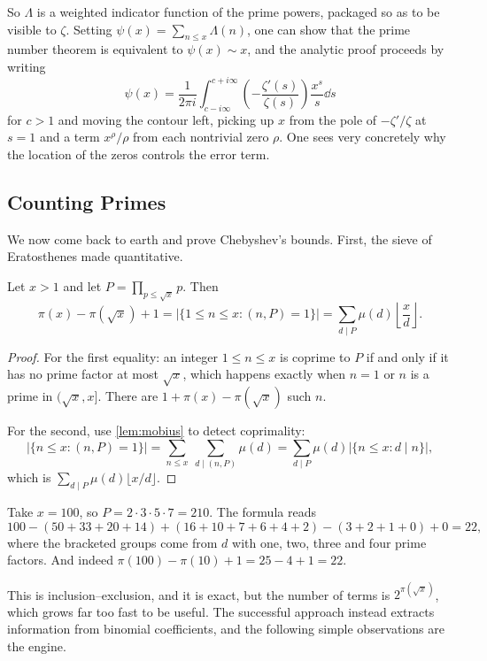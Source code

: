\documentclass[a4paper]{scrartcl}
\begin{document}
So $\Lambda$ is a weighted indicator function of the prime powers, packaged so as to be visible to $\zeta$. Setting $\psi(x) = \sum_{n \leq x}\Lambda(n)$, one can show that the prime number theorem is equivalent to $\psi(x) \sim x$, and the analytic proof proceeds by writing
$$
\psi(x) = \frac1{2\pi i}\int_{c - i\infty}^{c+i\infty}\left(-\frac{\zeta'(s)}{\zeta(s)}\right)\frac{x^s}s\dd s
$$
for $c > 1$ and moving the contour left, picking up $x$ from the pole of $-\zeta'/\zeta$ at $s = 1$ and a term $x^\rho/\rho$ from each nontrivial zero $\rho$. One sees very concretely why the location of the zeros controls the error term.

\subsection{Counting Primes}

We now come back to earth and prove Chebyshev's bounds. First, the sieve of Eratosthenes made quantitative.

\begin{proposition}
	Let $x > 1$ and let $P = \prod_{p \leq \sqrt x}p$. Then
	$$
	\pi(x) - \pi(\sqrt x) + 1 = \left|\{1 \leq n \leq x : (n, P) = 1\}\right| = \sum_{d \mid P}\mu(d)\left\lfloor\frac xd\right\rfloor.
	$$
\end{proposition}
\begin{proof}
	For the first equality: an integer $1 \leq n \leq x$ is coprime to $P$ if and only if it has no prime factor at most $\sqrt x$, which happens exactly when $n = 1$ or $n$ is a prime in $(\sqrt x, x]$. There are $1 + \pi(x) - \pi(\sqrt x)$ such $n$.

	For the second, use \autoref{lem:mobius} to detect coprimality:
	$$
	\left|\{n \leq x : (n,P) = 1\}\right| = \sum_{n \leq x}\ \sum_{d \mid (n, P)}\mu(d) = \sum_{d \mid P}\mu(d)\left|\{n \leq x : d \mid n\}\right|,
	$$
	which is $\sum_{d\mid P}\mu(d)\lfloor x/d\rfloor$.
\end{proof}

\begin{example}
	Take $x = 100$, so $P = 2\cdot3\cdot5\cdot7 = 210$. The formula reads
	$$
	100 - \left(50 + 33 + 20 + 14\right) + \left(16 + 10 + 7 + 6 + 4 + 2\right) - \left(3 + 2 + 1 + 0\right) + 0 = 22,
	$$
	where the bracketed groups come from $d$ with one, two, three and four prime factors. And indeed $\pi(100) - \pi(10) + 1 = 25 - 4 + 1 = 22$.
\end{example}

This is inclusion--exclusion, and it is exact, but the number of terms is $2^{\pi(\sqrt x)}$, which grows far too fast to be useful. The successful approach instead extracts information from binomial coefficients, and the following simple observations are the engine.
\end{document}
